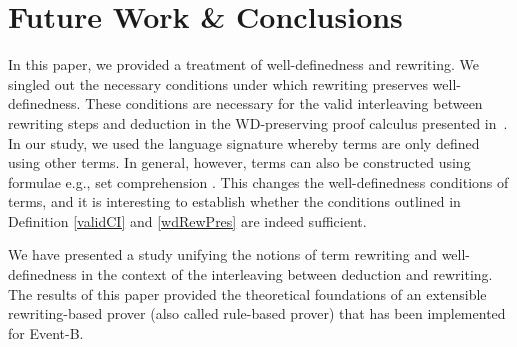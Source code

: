 \documentclass[copyright]{eptcs}
\begin{document}
\section{Future Work \& Conclusions}\label{future}
In this paper, we provided a treatment of well-definedness and rewriting. We singled out the necessary conditions under which rewriting preserves well-definedness. These conditions are necessary for the valid interleaving between rewriting steps and deduction in the WD-preserving proof calculus presented in~\cite{icfemMehta08}. In our study, we used the language signature  whereby terms are only defined using other terms. In general, however, terms can also be constructed using formulae e.g., set comprehension . This changes the well-definedness conditions of terms, and it is interesting to establish whether the conditions outlined in Definition \ref{validCI} and \ref{wdRewPres} are indeed sufficient.
\par
We have presented a study unifying the notions of term rewriting and well-definedness in the context of the interleaving between deduction and rewriting. The results of this paper provided the theoretical foundations of an extensible rewriting-based prover (also called rule-based prover) that has been implemented for Event-B.




\end{document}
